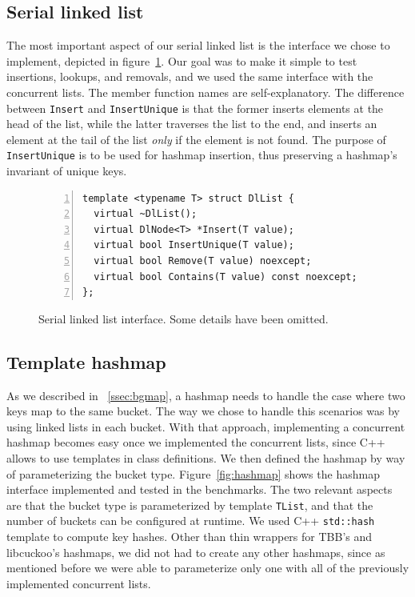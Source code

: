 \documentclass[11pt]{article}
\begin{document}
\subsection{Serial linked list}
The most important aspect of our serial linked list is the interface we chose to
implement, depicted in figure~\ref{fig:dllist}. Our goal was to make it simple
to test insertions, lookups, and removals, and we used the same interface with
the concurrent lists. The member function names are self-explanatory. The
difference between {\tt Insert} and {\tt InsertUnique} is that the former
inserts elements at the head of the list, while the latter traverses the list to
the end, and inserts an element at the tail of the list {\em only} if the
element is not found. The purpose of {\tt InsertUnique} is to be used for
hashmap insertion, thus preserving a hashmap's invariant of unique keys.

\begin{figure}[h]
\begin{center}
\begin{lstlisting}[numbers=left]
template <typename T> struct DlList {
  virtual ~DlList();
  virtual DlNode<T> *Insert(T value);
  virtual bool InsertUnique(T value);
  virtual bool Remove(T value) noexcept;
  virtual bool Contains(T value) const noexcept;
};
\end{lstlisting}
\caption{Serial linked list interface. Some details have been omitted.}
\label{fig:dllist}
\end{center}
\end{figure}

\subsection{Template hashmap}
As we described in ~\ref{ssec:bgmap}, a hashmap
needs to handle the case where two keys map to the same bucket. The way we chose
to handle this scenarios was by using linked lists in each bucket. With
that approach, implementing a concurrent hashmap becomes easy once we
implemented the concurrent lists, since C++ allows to use templates in class
definitions. We then defined the hashmap by way of parameterizing the bucket
type. Figure~\ref{fig:hashmap} shows the hashmap interface implemented and
tested in the benchmarks. The two relevant aspects are that the bucket type is
parameterized by template {\tt TList}, and that the number of buckets can be
configured at runtime. We used C++ {\tt std::hash} template to compute key
hashes. Other than thin wrappers for TBB's and libcuckoo's hashmaps, we did not
had to create any other hashmaps, since as mentioned before we were able to
parameterize only one with all of the previously implemented concurrent lists.
\end{document}
